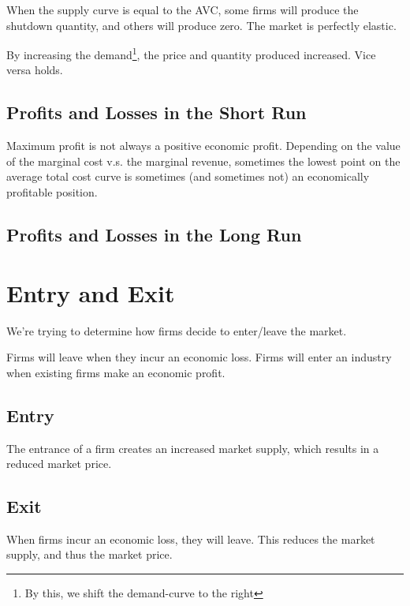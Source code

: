                 When the supply curve is equal to the \textsc{AVC}, some firms will produce the shutdown quantity, and others will produce zero.
                The market is perfectly elastic.

                By increasing the demand\footnote{By this, we shift the demand-curve to the right}, the price and quantity produced increased.
                Vice versa holds.

                \subsection{Profits and Losses in the Short Run} %
                \label{sub:profits_and_losses_in_the_short_run}
                    Maximum profit is not always a positive economic profit.
                    Depending on the value of the marginal cost v.s. the marginal revenue, sometimes the lowest point on the average total cost curve is sometimes (and sometimes not) an economically profitable position.
                \subsection{Profits and Losses in the Long Run} %
            \section{Entry and Exit} %
            \label{sec:entry_and_exit}
                We're trying to determine how firms decide to enter/leave the market.

                Firms will leave when they incur an economic loss.
                Firms will enter an industry when existing firms make an economic profit.
                \subsection{Entry} %
                \label{sub:entry}
                    The entrance of a firm creates an increased market supply, which results in a reduced market price.
                \subsection{Exit} %
                \label{sub:exit}
                    When firms incur an economic loss, they will leave.
                    This reduces the market supply, and thus the market price.
